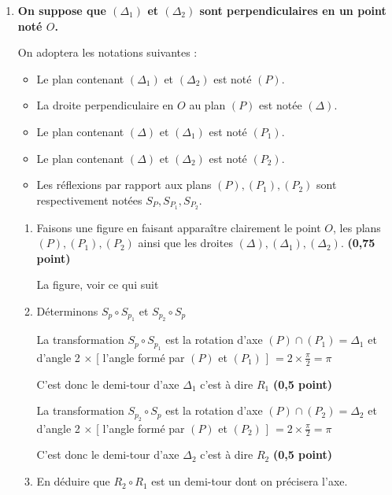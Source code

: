 \documentclass[12pt,a4paper]{article}
\begin{document}
\begin{enumerate}
\item \textbf{On suppose que \( (\Delta_1) \) et \( (\Delta_2) \) sont perpendiculaires en un point noté \( O \).}

On adoptera les notations suivantes :
\begin{itemize}
    \item Le plan contenant \( (\Delta_1) \) et \( (\Delta_2) \) est noté \( (P) \).
    \item La droite perpendiculaire en \( O \) au plan \( (P) \) est notée \( (\Delta) \).
    \item Le plan contenant \( (\Delta) \) et \( (\Delta_1) \) est noté \( (P_1) \).
    \item Le plan contenant \( (\Delta) \) et \( (\Delta_2) \) est noté \( (P_2) \).
    \item Les réflexions par rapport aux plans \( (P), (P_1), (P_2) \) sont respectivement notées \( S_P, S_{P_1}, S_{P_2} \).
\end{itemize}

\begin{enumerate}
    \item Faisons une figure en faisant apparaître clairement le point \( O \), les plans \( (P), (P_1), (P_2) \) ainsi que les droites \( (\Delta), (\Delta_1), (\Delta_2) \). \hfill \textbf{(0,75 point)}
    
    La figure, voir ce qui suit
    
    \item Déterminons \( S_{p} \circ S_{p_{1}} \) et \( S_{p_{2}} \circ S_{p} \)
    
    La transformation \( S_{p} \circ S_{p_{1}} \) est la rotation d’axe  $(P) \cap (P_{1}) = \Delta_{1}$ et  d’angle 2 $ \times $ [ l’angle formé par $(P) $ et $ (P_{1})$ ] $= 2 \times \frac{\pi}{2} = \pi $

C’est donc le demi-tour d’axe  $ \Delta_1 $ c’est à dire $ R_1 $ \hfill \textbf{(0,5 point)}

		La transformation \( S_{p_{2}} \circ S_{p}  \) est la rotation d’axe  $(P) \cap (P_{2}) = \Delta_{2}$ et  d’angle 2 $ \times $ [ l’angle formé par $(P) $ et $ (P_{2})$ ] $= 2 \times \frac{\pi}{2} = \pi $

C’est donc le demi-tour d’axe  $ \Delta_2 $ c’est à dire $ R_2 $ \hfill \textbf{(0,5 point)}

		\item En déduire que \( R_{2} \circ R_{1} \) est un demi-tour dont on précisera l’axe.
		

\end{enumerate}
\end{enumerate}
\end{document}
